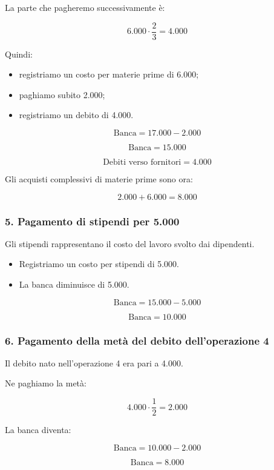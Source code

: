 \noindent La parte che pagheremo successivamente è:

\[
6.000\cdot\frac{2}{3}=4.000
\]

\noindent Quindi:

\begin{itemize}
    \item registriamo un costo per materie prime di 6.000;
    \item paghiamo subito 2.000;
    \item registriamo un debito di 4.000.
\end{itemize}

\[
\text{Banca}=17.000-2.000
\]

\[
\boxed{\text{Banca}=15.000}
\]

\[
\boxed{\text{Debiti verso fornitori}=4.000}
\]

\noindent Gli acquisti complessivi di materie prime
sono ora:

\[
2.000+6.000=\boxed{8.000}
\]

\subsubsection*{5. Pagamento di stipendi per 5.000}

\noindent Gli stipendi rappresentano il costo
del lavoro svolto dai dipendenti.

\begin{itemize}
    \item Registriamo un costo per stipendi di 5.000.
    \item La banca diminuisce di 5.000.
\end{itemize}

\[
\text{Banca}=15.000-5.000
\]

\[
\boxed{\text{Banca}=10.000}
\]

\subsubsection*{6. Pagamento della metà del debito
dell'operazione 4}

\noindent Il debito nato nell'operazione 4
era pari a 4.000.

\noindent Ne paghiamo la metà:

\[
4.000\cdot\frac{1}{2}=2.000
\]

\noindent La banca diventa:

\[
\text{Banca}=10.000-2.000
\]

\[
\boxed{\text{Banca}=8.000}
\]


